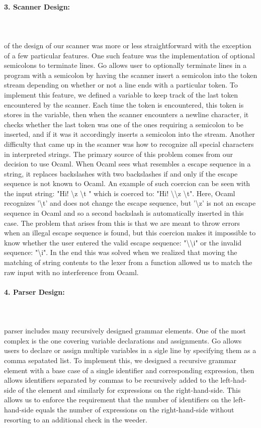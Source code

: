 \documentclass{article}
\begin{document}
\paragraph{3. Scanner Design:}\mbox{}\\\\
 of the  design of our scanner was more or less straightforward with the exception of a few particular features. One such feature was the implementation of optional semicolons to terminate lines. Go allows user to optionally terminate lines in a program with a semicolon by having the scanner insert a semicolon into the token stream depending on whether or not a line ends with a particular token. To implement this feature, we defined a variable to keep track of the last token encountered by the scanner. Each time the token is encountered, this token is stores in the variable, then when the scanner encounters a newline character, it checks whether the last token was one of the ones requiring a semicolon to be inserted, and if it was it accordingly inserts a semicolon into the stream. Another difficulty that came up in the scanner was how to recognize all special characters in interpreted strings. The primary source of this problem comes from our decision to use Ocaml. When Ocaml sees what resembles a escape sequence in a string, it replaces backslashes with two backslashes if and only if the escape sequence is not known to Ocaml. An example of such coercion can be seen with the input string: "Hi! \textbackslash{z} \textbackslash{t} " which is coerced to: "Hi! \textbackslash{\textbackslash{z}} \textbackslash{t}".
Here, Ocaml recognizes '\textbackslash{t}' and does not change the escape sequence, but '\textbackslash{z}' is not an escape sequence in Ocaml and so a second backslash is automatically inserted in this case. The problem that arises from this is that we are meant to throw errors when an illegal escape sequence is found, but this coercion makes it impossible to know whether the user entered the valid escape sequence: "\textbackslash{\textbackslash{i}}" or the invalid sequence: "\textbackslash{i}". In the end this was solved when we realized that moving the matching of string contents to the lexer from a function allowed us to match the raw input with no interference from Ocaml.
\paragraph{4. Parser Design:}\mbox{}\\\\
 parser includes many recursively designed grammar elements. One of the most complex is the one covering variable declarations and assignments. Go allows users to declare or assign multiple variables in a sigle line by specifying them as a comma sepatated list. To implement this, we designed a recursive grammar element with a base case of a single identifier and corresponding expression, then allows identifiers separated by commas to be recursively added to the left-had-side of the element and similarly for expressions on the right-hand-side. This allows us to enforce the requirement that the number of identifiers on the left-hand-side equals the number of expressions on the right-hand-side without resorting to an additional check in the weeder.
\end{document}

